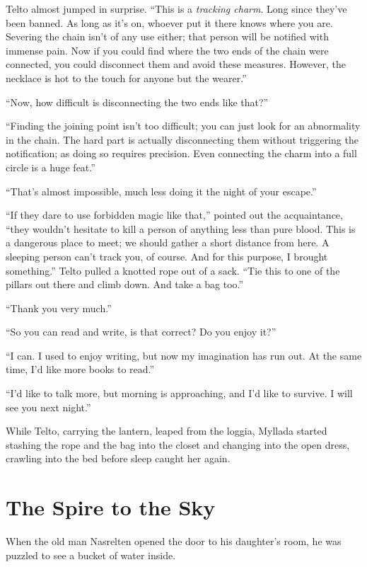 Telto almost jumped in surprise. ``This is a \emph{tracking charm}. Long since they've been banned. As long as it's on, whoever put it there knows where you are. Severing the chain isn't of any use either; that person will be notified with immense pain. Now if you could find where the two ends of the chain were connected, you could disconnect them and avoid these measures. However, the necklace is hot to the touch for anyone but the wearer.''

``Now, how difficult is disconnecting the two ends like that?''

``Finding the joining point isn't too difficult; you can just look for an abnormality in the chain. The hard part is actually disconnecting them without triggering the notification; as doing so requires precision. Even connecting the charm into a full circle is a huge feat.''

``That's almost impossible, much less doing it the night of your escape.''

``If they dare to use forbidden magic like that,'' pointed out the acquaintance, ``they wouldn't hesitate to kill a person of anything less than pure blood. This is a dangerous place to meet; we should gather a short distance from here. A sleeping person can't track you, of course. And for this purpose, I brought something.'' Telto pulled a knotted rope out of a sack. ``Tie this to one of the pillars out there and climb down. And take a bag too.''

``Thank you very much.''

``So you can read and write, is that correct? Do you enjoy it?''

``I can. I used to enjoy writing, but now my imagination has run out. At the same time, I'd like more books to read.''

``I'd like to talk more, but morning is approaching, and I'd like to survive. I will see you next night.''

While Telto, carrying the lantern, leaped from the loggia, Myllada started stashing the rope and the bag into the closet and changing into the open dress, crawling into the bed before sleep caught her again.

\chapter{The Spire to the Sky}

When the old man Nasrelten opened the door to his daughter's room, he was puzzled to see a bucket of water inside.

